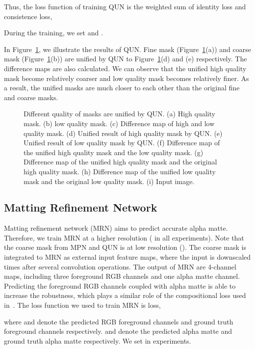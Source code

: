\documentclass[10pt,twocolumn,letterpaper]{article}
\begin{document}
Thus, the loss function of training QUN is the weighted sum of identity loss and consistence loss,



During the training, we set  and  .

In Figure~\ref{fig:demo_mqun}, we illustrate the results of QUN. Fine mask (Figure~\ref{fig:demo_mqun}(a)) and coarse mask (Figure~\ref{fig:demo_mqun}(b)) are unified by QUN to Figure~\ref{fig:demo_mqun}(d) and (e) respectively. The difference maps are also calculated. We can observe that the unified high quality mask become relatively coarser and low quality mask becomes relatively finer. As a result, the unified masks are much closer to each other than the original fine and coarse masks.

\begin{figure}[t]
  \centering
  \caption{Different quality of masks are unified by QUN. (a) High quality mask. (b) low quality mask. (c) Difference map of high and low quality mask. (d) Unified result of high quality mask by QUN. (e) Unified result of low quality mask by QUN. (f) Difference map of the unified high quality mask and the low quality mask. (g) Difference map of the unified high quality mask and the original high quality mask. (h) Difference map of the unified low quality mask and the original low quality mask. (i) Input image. }
  \label{fig:demo_mqun}
\end{figure}

\subsection{Matting Refinement Network}
Matting refinement network (MRN) aims to predict accurate alpha matte. Therefore, we train MRN at a higher resolution ( in all experiments). Note that the coarse mask from MPN and QUN is at low resolution (). The coarse mask is integrated to MRN as external input feature maps, where the input is downscaled  times after several convolution operations. The output of MRN are 4-channel maps, including three foreground RGB channels and one alpha matte channel. Predicting the foreground RGB channels coupled with alpha matte is able to increase the robustness, which plays a similar role of the compositional loss used in~\cite{xu2017deep,chen2018semantic}. The loss function we used to train MRN is  loss,

where  and  denote the predicted RGB foreground channels and ground truth foreground channels respectively.  and  denote the predicted alpha matte and ground truth alpha matte respectively. We set  in experiments.
\end{document}
